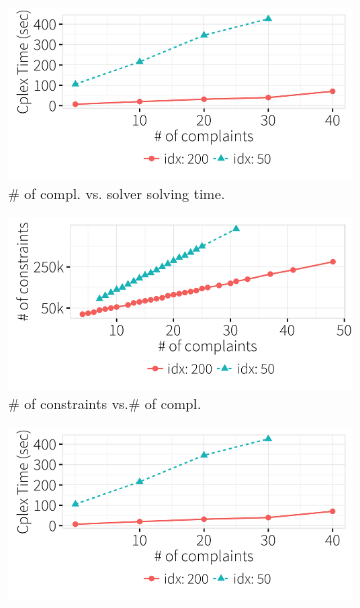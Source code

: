 \begin{figure}[t]
\begin{subfigure} [t]{.3\textwidth}
    \end{subfigure}
    \begin{subfigure} [t]{.3\textwidth}
    \includegraphics[width = .99\columnwidth]{figures/num_compl_time}
    \vspace*{-.25in}
    \caption{\# of compl. vs. solver solving time.}
    \vspace*{-.1in}
    \label{f:compl_vs_time} 
    \end{subfigure} 
    \iffalse
    \begin{subfigure} [t]{.3\textwidth}
    \includegraphics[width = .99\columnwidth]{figures/num_compl_cons}
    \vspace*{-.25in}
    \caption{\# of constraints vs.\# of compl.}
    \vspace*{-.1in}
    \label{f:compl_vs_cons} 
    \end{subfigure}
    \begin{subfigure} [t]{.3\textwidth}
    \includegraphics[width = .99\columnwidth]{figures/num_compl_time}

\end{subfigure}
\end{figure}

